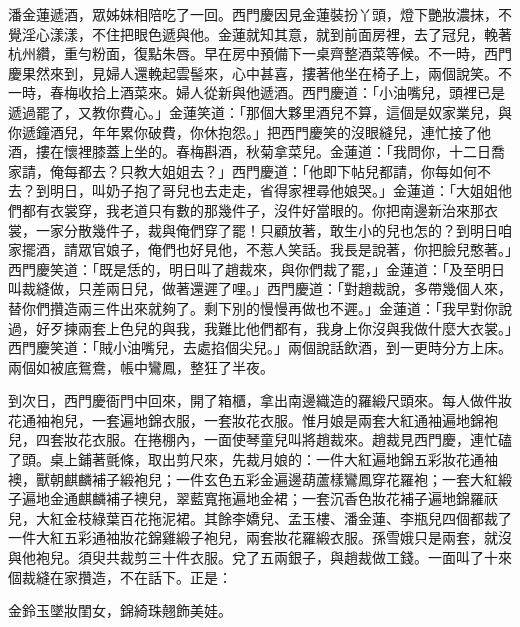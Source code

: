 潘金蓮遞酒，眾姊妹相陪吃了一回。西門慶因見金蓮裝扮丫頭，燈下艷妝濃抹，不覺淫心漾漾，不住把眼色遞與他。金蓮就知其意，就到前面房裡，去了冠兒，輓著杭州纘，重勻粉面，復點朱唇。早在房中預備下一桌齊整酒菜等候。不一時，西門慶果然來到，見婦人還輓起雲髻來，心中甚喜，摟著他坐在椅子上，兩個說笑。不一時，春梅收拾上酒菜來。婦人從新與他遞酒。西門慶道：「小油嘴兒，頭裡已是遞過罷了，又教你費心。」金蓮笑道：「那個大夥里酒兒不算，這個是奴家業兒，與你遞鐘酒兒，年年累你破費，你休抱怨。」把西門慶笑的沒眼縫兒，連忙接了他酒，摟在懷裡膝蓋上坐的。春梅斟酒，秋菊拿菜兒。金蓮道：「我問你，十二日喬家請，俺每都去？只教大姐姐去？」西門慶道：「他即下帖兒都請，你每如何不去？到明日，叫奶子抱了哥兒也去走走，省得家裡尋他娘哭。」金蓮道：「大姐姐他們都有衣裳穿，我老道只有數的那幾件子，沒件好當眼的。你把南邊新治來那衣裳，一家分散幾件子，裁與俺們穿了罷！只顧放著，敢生小的兒也怎的？到明日咱家擺酒，請眾官娘子，俺們也好見他，不惹人笑話。我長是說著，你把臉兒憨著。」西門慶笑道：「既是恁的，明日叫了趙裁來，與你們裁了罷，」金蓮道：「及至明日叫裁縫做，只差兩日兒，做著還遲了哩。」西門慶道：「對趙裁說，多帶幾個人來，替你們攢造兩三件出來就夠了。剩下別的慢慢再做也不遲。」金蓮道：「我早對你說過，好歹揀兩套上色兒的與我，我難比他們都有，我身上你沒與我做什麼大衣裳。」西門慶笑道：「賊小油嘴兒，去處掐個尖兒。」兩個說話飲酒，到一更時分方上床。兩個如被底鴛鴦，帳中鸞鳳，整狂了半夜。

到次日，西門慶衙門中回來，開了箱櫃，拿出南邊織造的羅緞尺頭來。每人做件妝花通袖袍兒，一套遍地錦衣服，一套妝花衣服。惟月娘是兩套大紅通袖遍地錦袍兒，四套妝花衣服。在捲棚內，一面使琴童兒叫將趙裁來。趙裁見西門慶，連忙磕了頭。桌上鋪著氈條，取出剪尺來，先裁月娘的：一件大紅遍地錦五彩妝花通袖襖，獸朝麒麟補子緞袍兒；一件玄色五彩金遍邊葫蘆樣鸞鳳穿花羅袍；一套大紅緞子遍地金通麒麟補子襖兒，翠藍寬拖遍地金裙；一套沉香色妝花補子遍地錦羅祆兒，大紅金枝綠葉百花拖泥裙。其餘李嬌兒、孟玉樓、潘金蓮、李瓶兒四個都裁了一件大紅五彩通袖妝花錦雞緞子袍兒，兩套妝花羅緞衣服。孫雪娥只是兩套，就沒與他袍兒。須臾共裁剪三十件衣服。兌了五兩銀子，與趙裁做工錢。一面叫了十來個裁縫在家攢造，不在話下。正是：

金鈴玉墜妝閨女，錦綺珠翹飾美娃。

